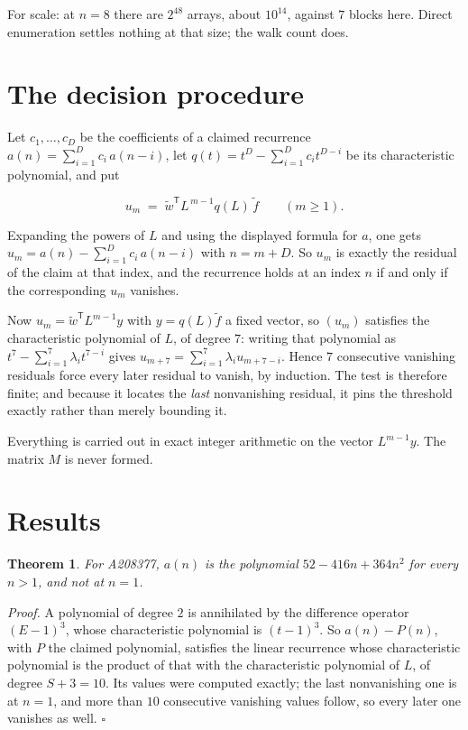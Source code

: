 \documentclass[11pt]{article}
\newtheorem{theorem}{Theorem}
\theoremstyle{definition}
\begin{document}
For scale: at $n = 8$ there are $2^{48}$ arrays, about $10^{14}$, against $7$ blocks here. Direct enumeration settles nothing at that size; the walk count does.

\section{The decision procedure}

Let $c_1,\dots,c_D$ be the coefficients of a claimed recurrence $a(n) = \sum_{i=1}^{D} c_i\,a(n-i)$, let $q(t) = t^{D} - \sum_{i=1}^{D} c_i t^{D-i}$ be its characteristic polynomial, and put

\[u_m \;=\; \tilde w^{\mathsf T} L^{\,m-1} q(L)\,\tilde f \qquad (m \ge 1).\]

Expanding the powers of $L$ and using the displayed formula for $a$, one gets $u_m = a(n) - \sum_{i=1}^{D} c_i\,a(n-i)$ with $n = m + D$. So $u_m$ is exactly the residual of the claim at that index, and the recurrence holds at an index $n$ if and only if the corresponding $u_m$ vanishes.

Now $u_m = \tilde w^{\mathsf T} L^{m-1} y$ with $y = q(L)\tilde f$ a fixed vector, so $(u_m)$ satisfies the characteristic polynomial of $L$, of degree $7$: writing that polynomial as $t^{7} - \sum_{i=1}^{7} \lambda_i t^{7-i}$ gives $u_{m+7} = \sum_{i=1}^{7} \lambda_i u_{m+7-i}$. Hence $7$ consecutive vanishing residuals force every later residual to vanish, by induction. The test is therefore finite; and because it locates the {\itshape last} nonvanishing residual, it pins the threshold exactly rather than merely bounding it.

Everything is carried out in exact integer arithmetic on the vector $L^{m-1}y$. The matrix $M$ is never formed.

\section{Results}

\begin{theorem} For A208377, $a(n)$ is the polynomial $52 - 416n + 364n^{2}$ for every $n > 1$, and not at $n = 1$.\end{theorem}

{\itshape Proof.} A polynomial of degree $2$ is annihilated by the difference operator $(E-1)^{3}$, whose characteristic polynomial is $(t-1)^{3}$. So $a(n) - P(n)$, with $P$ the claimed polynomial, satisfies the linear recurrence whose characteristic polynomial is the product of that with the characteristic polynomial of $L$, of degree $S + 3 = 10$. Its values were computed exactly; the last nonvanishing one is at $n = 1$, and more than $10$ consecutive vanishing values follow, so every later one vanishes as well. $\square$
\end{document}
